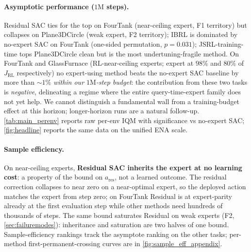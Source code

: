 \documentclass{article}
\begin{document}
\paragraph{Asymptotic performance ($1\mathrm{M}$ steps).}
Residual SAC ties for the top on FourTank (near-ceiling expert, F1
territory) but collapses on Plane3DCircle (weak expert, F2 territory);
IBRL is dominated by no-expert SAC on FourTank (one-sided permutation,
$p{=}0.031$); JSRL-training-time tops Plane3DCircle clean but is the
most undertuning-fragile method. On FourTank and GlassFurnace
(RL-near-ceiling experts; expert at $98\%$ and $80\%$ of
$J_{\mathrm{RL}}$ respectively) no expert-using method beats the
no-expert SAC baseline by more than $\sim$$1\%$ \emph{within our
$1\mathrm{M}$-step budget}: the contribution from these two tasks
is \emph{negative}, delineating a regime where the entire
query-time-expert family does not yet help. We cannot distinguish
a fundamental wall from a training-budget effect at this horizon;
longer-horizon runs are a natural follow-up. \cref{tab:main_perenv}
reports raw per-env IQM with significance vs no-expert SAC;
\cref{fig:headline} reports the same data on the unified ENA scale.

\paragraph{Sample efficiency.}
On near-ceiling experts, \textbf{Residual SAC inherits the expert at
no learning cost}: a property of the bound on $a_{\mathrm{res}}$,
not a learned outcome. The residual correction collapses to near
zero on a near-optimal expert, so the deployed action matches the
expert from step zero; on FourTank Residual is at expert-parity
already at the first evaluation step while other methods need
hundreds of thousands of steps. The same bound saturates Residual
on weak experts (F2, \cref{sec:failuremodes}): inheritance and
saturation are two halves of one bound. Sample-efficiency rankings
track the asymptote ranking on the other tasks; per-method
first-permanent-crossing curves are in \cref{fig:sample_eff_appendix}.

\begin{table}[h]
\centering
\small
\renewcommand{\arraystretch}{1.15}
%
\caption{Per-env asymptotic IQM final return at $1\mathrm{M}$
training steps ($100$ seeds for control, $50$ for CheetahRun). All
cells are raw IQM in the task's native units; SAC (no expert) is
the anchor row. Significance markers on each non-SAC row are
two-sided Mann-Whitney $U$ tests of \emph{that method vs.\ SAC} on
the per-seed final-window scalars, Holm-Bonferroni-corrected
within env over the family of five expert-using methods
($^{*}{:}p_{\mathrm{corr}}{<}0.05$,
$^{**}{:}p_{\mathrm{corr}}{<}0.01$,
$^{***}{:}p_{\mathrm{corr}}{<}0.001$).
Methodology, per-method CIs, and ENA-normalized companion:
\cref{app:perenv,app:significance,fig:headline}.}
\label{tab:main_perenv}
\end{table}
\end{document}
